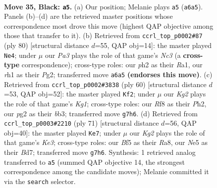 \documentclass[11pt]{article}
\begin{document}
\clearpage

\begin{figure}[p]\centering
\begin{subfigure}{0.46\textwidth}\centering
\resizebox{\linewidth}{!}{%
\newchessgame
\chessboard[
  setfen={5r2/4r1k1/pp6/2p1nb2/P5p1/1KP5/6PP/2N1RBNR b - - 1 35},
  showmover=false,
  pgfstyle=straightmove, color=movearrow, markmove={a6-a5}
]}
\caption{}
\end{subfigure}\hfill
\begin{subfigure}{0.46\textwidth}\centering
\resizebox{\linewidth}{!}{%
\newchessgame
\chessboard[
  setfen={3br1n1/2p2r2/2k5/2p1Pp2/1p5p/2N4P/1PP3PB/R4R1K w - - 0 41},
  showmover=false,
  pgfstyle=straightmove, color=movearrow, markmove={c3-e4}
]}
\caption{}
\end{subfigure}
\\[4pt]
\begin{subfigure}{0.46\textwidth}\centering
\resizebox{\linewidth}{!}{%
\newchessgame
\chessboard[
  setfen={8/1pr1kppp/1n6/p5P1/5P2/PbN1PB2/7P/2R3K1 w - - 3 31},
  showmover=false,
  pgfstyle=straightmove, color=movearrow, markmove={g1-f2}
]}
\caption{}
\end{subfigure}\hfill
\begin{subfigure}{0.46\textwidth}\centering
\resizebox{\linewidth}{!}{%
\newchessgame
\chessboard[
  setfen={r2r4/1p1b3p/4k1p1/1P3p2/4p2P/4P3/3RNPP1/1R4K1 b - - 4 36},
  showmover=false,
  pgfstyle=straightmove, color=movearrow, markmove={e6-e7}
]}
\caption{}
\end{subfigure}
\caption{\textbf{Move 35, Black: \texttt{a5}.} (a) Our position; Melanie plays \texttt{a5} (\texttt{a6a5}). Panels (b)--(d) are the retrieved master positions whose correspondence most drove this move (highest QAP objective among those that transfer to it). (b) Retrieved from \texttt{ccrl\_top\_p0002\#87} (ply 80) [structural distance $d$=55, QAP obj=14]: the master played \texttt{Ne4}; under $\mu$ our \emph{Pa3} plays the role of that game's \emph{Nc3} (a \textbf{cross-type} correspondence); cross-type roles: our \emph{p}h2 as their \emph{R}a1, our \emph{r}h1 as their \emph{P}g2; transferred move \texttt{a6a5} \textbf{(endorses this move)}. (c) Retrieved from \texttt{ccrl\_top\_p0002\#3838} (ply 60) [structural distance $d$=53, QAP obj=52]: the master played \texttt{Kf2}; under $\mu$ our \emph{Kg2} plays the role of that game's \emph{Kg1}; cross-type roles: our \emph{R}f8 as their \emph{P}h2, our \emph{p}g2 as their \emph{b}b3; transferred move \texttt{g7h6}. (d) Retrieved from \texttt{ccrl\_top\_p0003\#2210} (ply 71) [structural distance $d$=56, QAP obj=40]: the master played \texttt{Ke7}; under $\mu$ our \emph{Kg2} plays the role of that game's \emph{Ke3}; cross-type roles: our \emph{B}f5 as their \emph{R}a8, our \emph{N}e5 as their \emph{B}d7; transferred move \texttt{g7h6}. Synthesis: 1 retrieved analog transferred to \texttt{a5} (summed QAP objective 14, the strongest correspondence among the candidate moves); Melanie committed it via the \texttt{search} selector.}
\label{fig:thought-m69}
\end{figure}
\end{document}
